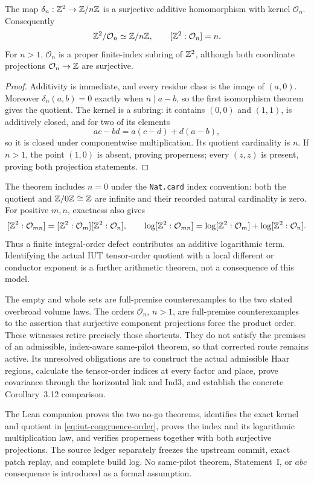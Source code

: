 \begin{theorem}
\label{thm:iut-congruence-order-index}
The map $\delta_n:\mathbb Z^2\to\mathbb Z/n\mathbb Z$ is a surjective additive homomorphism with
kernel $\mathcal O_n$.  Consequently
\[
       \mathbb Z^2/\mathcal O_n\simeq\mathbb Z/n\mathbb Z,
       \qquad [\mathbb Z^2:\mathcal O_n]=n.
\]
For $n>1$, $\mathcal O_n$ is a proper finite-index subring of $\mathbb Z^2$, although
both coordinate projections $\mathcal O_n\to\mathbb Z$ are surjective.
\end{theorem}

\begin{proof}
Additivity is immediate, and every residue class is the image of $(a,0)$.
Moreover $\delta_n(a,b)=0$ exactly when $n\mid a-b$, so the first isomorphism
theorem gives the quotient.  The kernel is a subring: it contains $(0,0)$
and $(1,1)$, is additively closed, and for two of its elements
\[
                    ac-bd=a(c-d)+d(a-b),
\]
so it is closed under componentwise multiplication.  Its quotient
cardinality is $n$.  If $n>1$, the point
$(1,0)$ is absent, proving properness; every $(z,z)$ is present, proving both
projection statements.
\end{proof}

The theorem includes $n=0$ under the \texttt{Nat.card} index convention:
both the quotient and $\mathbb Z/0\mathbb Z\cong\mathbb Z$ are infinite and their recorded natural
cardinality is zero.  For positive $m,n$, exactness also gives
\begin{equation}\label{eq:iut-order-index-log-additivity}
 [\mathbb Z^2:\mathcal O_{mn}]
 =[\mathbb Z^2:\mathcal O_m][\mathbb Z^2:\mathcal O_n],
 \qquad
 \log[\mathbb Z^2:\mathcal O_{mn}]
 =\log[\mathbb Z^2:\mathcal O_m]+\log[\mathbb Z^2:\mathcal O_n].
\end{equation}
Thus a finite integral-order defect contributes an additive logarithmic term.
Identifying the actual IUT tensor-order quotient with a local different or
conductor exponent is a further arithmetic theorem, not a consequence of
this model.

The empty and whole sets are full-premise counterexamples to the two stated
overbroad volume laws.  The orders $\mathcal O_n$, $n>1$, are full-premise
counterexamples to the assertion that surjective component projections force
the product order.  These witnesses retire precisely those shortcuts.  They
do not satisfy the premises of an admissible, index-aware same-pilot theorem,
so that corrected route remains active.  Its unresolved obligations are to
construct the actual admissible Haar regions, calculate the tensor-order
indices at every factor and place, prove covariance through the horizontal
link and Ind3, and establish the concrete Corollary~3.12 comparison.

The Lean companion proves the two no-go theorems, identifies the exact kernel
and quotient in \eqref{eq:iut-congruence-order}, proves the index and its
logarithmic multiplication law, and verifies properness together with both
surjective projections.  The source ledger separately freezes the upstream
commit, exact patch replay, and complete build log.  No same-pilot theorem,
Statement~I, or $abc$ consequence is introduced as a formal assumption.
